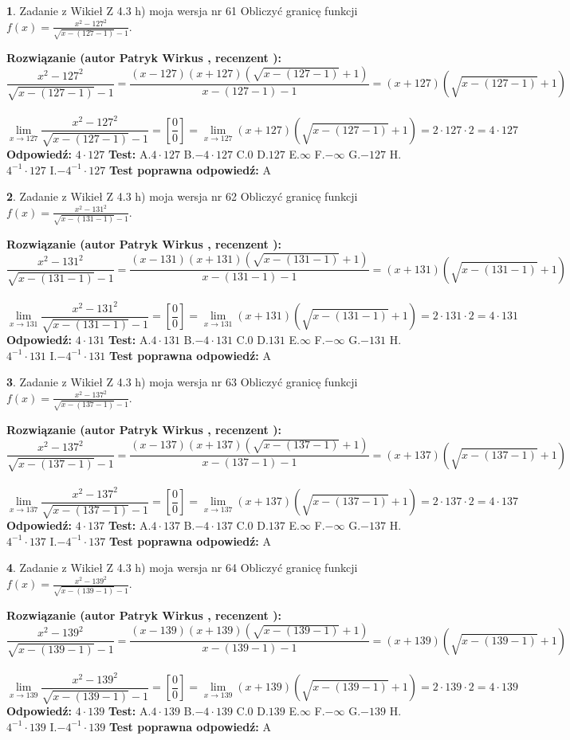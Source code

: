 \documentclass[12pt, a4paper]{article}
\theoremstyle{definition} %
\newtheorem{zad}{}
\newcommand{\zadStart}[1]{\begin{zad}#1\newline}
\newcommand{\zadStop}{\end{zad}}
\newcommand{\rozwStart}[2]{\noindent \textbf{Rozwiązanie (autor #1 , recenzent #2): }\newline}
\newcommand{\rozwStop}{\newline}
\newcommand{\odpStart}{\noindent \textbf{Odpowiedź:}\newline}
\newcommand{\odpStop}{\newline}
\newcommand{\testStart}{\noindent \textbf{Test:}\newline}
\newcommand{\testStop}{\newline}
\newcommand{\kluczStart}{\noindent \textbf{Test poprawna odpowiedź:}\newline}
\newcommand{\kluczStop}{\newline}
\begin{document}
\zadStart{Zadanie z Wikieł Z 4.3 h) moja wersja nr 61}
Obliczyć granicę funkcji $f(x)=\frac{x^{2} - 127^{2}}{\sqrt{x-(127-1)}-1}$.
\zadStop
\rozwStart{Patryk Wirkus}{}
$$\frac{x^{2} - 127^{2}}{\sqrt{x-(127-1)}-1}=\frac{(x-127)(x+127)(\sqrt{x-(127-1)}+1)}{x-(127-1)-1}=(x+127)(\sqrt{x-(127-1)}+1)$$
\\
$$\lim\limits_{x\to 127}\frac{x^{2} - 127^{2}}{\sqrt{x-(127-1)}-1}=[\frac{0}{0}]=
\lim\limits_{x\to 127}(x+127)(\sqrt{x-(127-1)}+1) = 2\cdot127 \cdot 2 = 4 \cdot 127$$
\rozwStop
\odpStart
$4\cdot127$
\odpStop
\testStart
A.$4\cdot127$
B.$-4\cdot127$
C.$0$
D.$127$
E.$\infty$
F.$-\infty$
G.$-127$
H.$4^{-1}\cdot127$
I.$-4^{-1}\cdot127$
\testStop
\kluczStart
A
\kluczStop



\zadStart{Zadanie z Wikieł Z 4.3 h) moja wersja nr 62}
Obliczyć granicę funkcji $f(x)=\frac{x^{2} - 131^{2}}{\sqrt{x-(131-1)}-1}$.
\zadStop
\rozwStart{Patryk Wirkus}{}
$$\frac{x^{2} - 131^{2}}{\sqrt{x-(131-1)}-1}=\frac{(x-131)(x+131)(\sqrt{x-(131-1)}+1)}{x-(131-1)-1}=(x+131)(\sqrt{x-(131-1)}+1)$$
\\
$$\lim\limits_{x\to 131}\frac{x^{2} - 131^{2}}{\sqrt{x-(131-1)}-1}=[\frac{0}{0}]=
\lim\limits_{x\to 131}(x+131)(\sqrt{x-(131-1)}+1) = 2\cdot131 \cdot 2 = 4 \cdot 131$$
\rozwStop
\odpStart
$4\cdot131$
\odpStop
\testStart
A.$4\cdot131$
B.$-4\cdot131$
C.$0$
D.$131$
E.$\infty$
F.$-\infty$
G.$-131$
H.$4^{-1}\cdot131$
I.$-4^{-1}\cdot131$
\testStop
\kluczStart
A
\kluczStop



\zadStart{Zadanie z Wikieł Z 4.3 h) moja wersja nr 63}
Obliczyć granicę funkcji $f(x)=\frac{x^{2} - 137^{2}}{\sqrt{x-(137-1)}-1}$.
\zadStop
\rozwStart{Patryk Wirkus}{}
$$\frac{x^{2} - 137^{2}}{\sqrt{x-(137-1)}-1}=\frac{(x-137)(x+137)(\sqrt{x-(137-1)}+1)}{x-(137-1)-1}=(x+137)(\sqrt{x-(137-1)}+1)$$
\\
$$\lim\limits_{x\to 137}\frac{x^{2} - 137^{2}}{\sqrt{x-(137-1)}-1}=[\frac{0}{0}]=
\lim\limits_{x\to 137}(x+137)(\sqrt{x-(137-1)}+1) = 2\cdot137 \cdot 2 = 4 \cdot 137$$
\rozwStop
\odpStart
$4\cdot137$
\odpStop
\testStart
A.$4\cdot137$
B.$-4\cdot137$
C.$0$
D.$137$
E.$\infty$
F.$-\infty$
G.$-137$
H.$4^{-1}\cdot137$
I.$-4^{-1}\cdot137$
\testStop
\kluczStart
A
\kluczStop



\zadStart{Zadanie z Wikieł Z 4.3 h) moja wersja nr 64}
Obliczyć granicę funkcji $f(x)=\frac{x^{2} - 139^{2}}{\sqrt{x-(139-1)}-1}$.
\zadStop
\rozwStart{Patryk Wirkus}{}
$$\frac{x^{2} - 139^{2}}{\sqrt{x-(139-1)}-1}=\frac{(x-139)(x+139)(\sqrt{x-(139-1)}+1)}{x-(139-1)-1}=(x+139)(\sqrt{x-(139-1)}+1)$$
\\
$$\lim\limits_{x\to 139}\frac{x^{2} - 139^{2}}{\sqrt{x-(139-1)}-1}=[\frac{0}{0}]=
\lim\limits_{x\to 139}(x+139)(\sqrt{x-(139-1)}+1) = 2\cdot139 \cdot 2 = 4 \cdot 139$$
\rozwStop
\odpStart
$4\cdot139$
\odpStop
\testStart
A.$4\cdot139$
B.$-4\cdot139$
C.$0$
D.$139$
E.$\infty$
F.$-\infty$
G.$-139$
H.$4^{-1}\cdot139$
I.$-4^{-1}\cdot139$
\testStop
\kluczStart
A
\kluczStop
\end{document}

